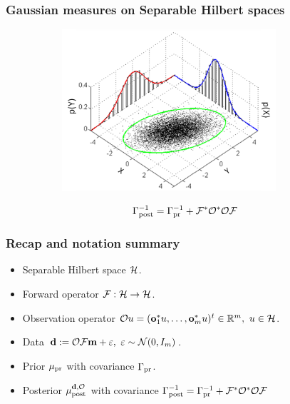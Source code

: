 \documentclass{beamer}
\begin{document}
\begin{frame}
\frametitle{Gaussian measures on Separable Hilbert spaces}
\begin{figure}
   \includegraphics[width=10cm,height=6cm]{MultivariateNormal.png}
\end{figure}

\begin{align*}
  \Gamma_{\textup{post}}^{-1} = \Gamma_{\textup{pr}}^{-1} + \mathcal{F}^* \mathcal{O}^*\mathcal{O} \mathcal{F}
\end{align*}

\end{frame}

\begin{frame}
\frametitle{Recap and notation summary}

\begin{itemize}
\item Separable Hilbert space \(\mathcal{H}\).
\item Forward operator \(\mathcal{F}: \mathcal{H} \to \mathcal{H}\).
\item Observation operator \(\mathcal{O} u = (\mathbf{o}_1^*u, \dots, \mathbf{o}_m^*u )^t \in \mathbb{R}^m,\ u \in \mathcal{H}\).
\item Data \(\mathbf{d} := \mathcal{O} \mathcal{F} \mathbf{m} + \varepsilon,\ \varepsilon \sim \mathcal{N}(0,I_m)\).
\item Prior \(\mu_{\textup{pr}}\) with covariance \(\Gamma_{\textup{pr}}\).
\item Posterior \(\mu_{\textup{post}}^{\mathbf{d}, \mathcal{O}}\) with covariance \(\Gamma_{\textup{post}}^{-1} = \Gamma_{\textup{pr}}^{-1} + \mathcal{F}^* \mathcal{O}^*\mathcal{O} \mathcal{F}\)
\end{itemize}
\end{frame}

\begin{frame}
 
\end{frame}
\end{document}
